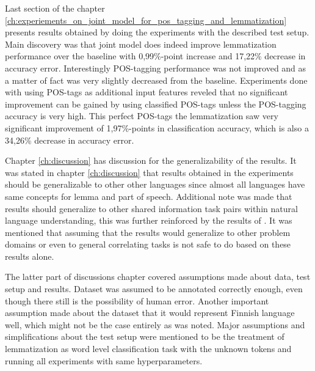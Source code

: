 \documentclass[12pt,a4paper,english
]{tutthesis}
\begin{document}
Last section of the chapter \ref{ch:experiements_on_joint_model_for_pos_tagging_and_lemmatization} presents results obtained by doing the experiments with the described test setup. Main discovery was that joint model does indeed improve lemmatization performance over the baseline with 0,99\%-point increase and 17,22\% decrease in accuracy error. Interestingly POS-tagging performance was not improved and as a matter of fact was very slightly decreased from the baseline. Experiments done with using POS-tags as additional input features reveled that no significant improvement can be gained by using classified POS-tags unless the POS-tagging accuracy is very high. This perfect POS-tags the lemmatization saw very significant improvement of 1,97\%-points in classification accuracy, which is also a 34,26\% decrease in accuracy error.

Chapter \ref{ch:discussion} has discussion for the generalizability of the results. It was stated in chapter \ref{ch:discussion} that results obtained in the experiments should be generalizable to other other languages since almost all languages have same concepts for lemma and part of speech. Additional note was made that results should generalize to other shared information task pairs within natural language understanding, this was further reinforced by the results of \cite{Liu2016a}. It was mentioned that assuming that the results would generalize to other problem domains or even to general correlating tasks is not safe to do based on these results alone. 

The latter part of discussions chapter covered assumptions made about data, test setup and results. Dataset was assumed to be annotated correctly enough, even though there still is the possibility of human error. Another important assumption made about the dataset that it would represent Finnish language well, which might not be the case entirely as was noted. Major assumptions and simplifications about the test setup were mentioned to be the treatment of lemmatization as word level classification task with the unknown tokens and running all experiments with same hyperparameters.
\end{document}
